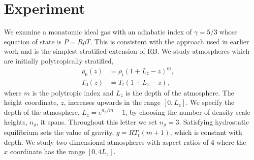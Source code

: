 \documentclass[aps, prl, twocolumn, nofootinbib, groupedaddress, amsfonts, amssymb, amsmath]{revtex4-1}
\begin{document}
\section{Experiment} 
\label{sec:experiment}
We examine a monatomic ideal gas with an adiabatic index of
$\gamma = 5/3$ whose equation of state is $P = R\rho T$.
This is consistent with the approach used in earlier work
and is the simplest stratified extension of RB.
We study atmospheres which are initially polytropically stratified,
\begin{equation}
\begin{split}
\rho_0(z) &= \rho_{t}(1 + L_z - z)^m, \\
T_0(z)    &= T_{t}(1 + L_z - z),
\label{eqn:polytrope}
\end{split}
\end{equation}
where $m$ is the polytropic index and $L_z$ is the depth of the atmosphere.
The height coordinate, $z$, increases upwards in the range $[0, L_z]$.  We
specify the depth of the atmosphere, $L_z = e^{n_{\rho}/m} - 1$, by choosing
the number of density scale heights, $n_{\rho}$, it spans.
Throughout this letter we set $n_{\rho} = 3$.  Satisfying hydrostatic
equilibrium sets the value of gravity, $g = R T_t (m + 1)$, which is
constant with depth.  We study two-dimensional atmospheres with aspect
ratios of 4 where the $x$ coordinate has the range $[0, 4L_z]$.
\end{document}
